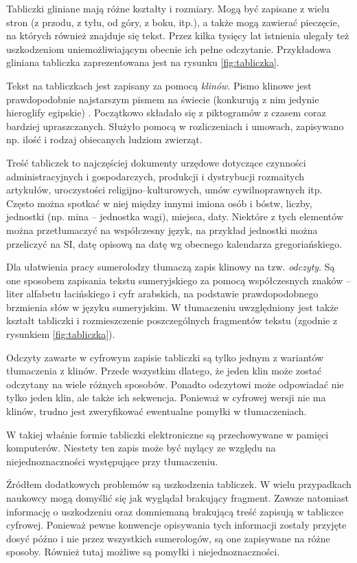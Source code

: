 Tabliczki gliniane mają różne kształty i rozmiary. 
Mogą być zapisane z wielu stron (z przodu, z tyłu, od góry, z boku, itp.), a także mogą zawierać pieczęcie, 
na których również znajduje się tekst. Przez kilka tysięcy lat istnienia ulegały też uszkodzeniom uniemożliwiającym 
obecnie ich pełne odczytanie.
Przykładowa gliniana tabliczka zaprezentowana jest na rysunku \ref{fig:tabliczka}.

Tekst na tabliczkach jest zapisany za pomocą \emph{klinów}. Pismo klinowe jest prawdopodobnie najstarszym pismem na świecie 
(konkurują z nim jedynie hieroglify egipskie)  \cite{kuckenburg}. Początkowo składało się z piktogramów z czasem coraz bardziej upraszczanych.
Służyło pomocą w rozliczeniach i umowach, zapisywano np. ilość i rodzaj obiecanych ludziom zwierząt.

Treść tabliczek to najczęściej dokumenty urzędowe dotyczące czynności administracyjnych i gospodarczych, 
produkcji i dystrybucji rozmaitych artykułów, uroczystości religijno--kulturowych, umów cywilnoprawnych itp. \cite{powalka}
Często można spotkać w niej między innymi imiona osób i bóstw, liczby, jednostki (np. mina -- jednostka wagi), %
miejsca, daty. Niektóre z tych elementów można przetłumaczyć na współczesny język, na przykład jednostki można przeliczyć na SI, 
datę opisową na datę wg obecnego kalendarza gregoriańskiego. 

Dla ułatwienia pracy sumerolodzy tłumaczą zapis klinowy na tzw. \emph{odczyty}. 
Są one sposobem zapisania tekstu sumeryjskiego za pomocą współczesnych znaków -- liter alfabetu łacińskiego i cyfr arabskich, 
na podstawie prawdopodobnego brzmienia słów w języku sumeryjskim. 
W tłumaczeniu uwzględniony jest także kształt tabliczki i rozmieszczenie poszczególnych fragmentów tekstu 
(zgodnie z rysunkiem \ref{fig:tabliczka}). 
 
Odczyty zawarte w cyfrowym zapisie tabliczki są tylko jednym z wariantów tłumaczenia z klinów. 
Przede wszystkim dlatego, że jeden klin może zostać odczytany na wiele różnych sposobów. 
Ponadto odczytowi może odpowiadać nie tylko jeden klin, ale także ich sekwencja. 
Ponieważ w cyfrowej wersji nie ma klinów, trudno jest zweryfikować ewentualne pomyłki w tłumaczeniach.

W takiej właśnie formie tabliczki elektroniczne są przechowywane w pamięci komputerów. 
Niestety ten zapis może być mylący ze względu na niejednoznaczności występujące przy tłumaczeniu. 

Źródłem dodatkowych problemów są uszkodzenia tabliczek. 
W wielu przypadkach naukowcy mogą domyślić się jak wyglądał brakujący fragment. 
Zawsze natomiast informację o uszkodzeniu oraz domniemaną brakującą treść zapisują w tabliczce cyfrowej.
Ponieważ pewne konwencje opisywania tych informacji zostały przyjęte dosyć późno i nie przez wszystkich sumerologów, 
są one zapisywane na różne sposoby. Również tutaj możliwe są pomyłki i niejednoznaczności.

